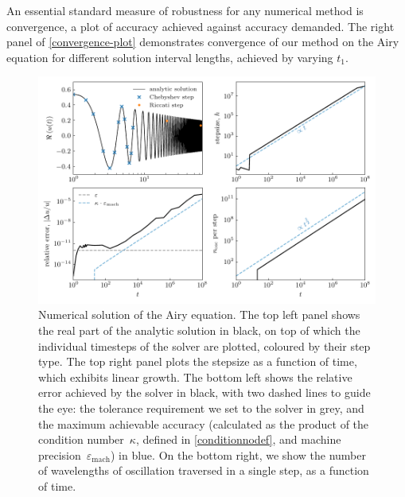 \documentclass[10pt]{article}
\newcommand{\om}{\omega}
\begin{document}
An essential standard measure of robustness for any numerical method is convergence, a plot of accuracy achieved against accuracy demanded. The right panel of \cref{convergence-plot} demonstrates convergence of our method on the Airy equation for different solution interval lengths, achieved by varying $t_1$.

\begin{figure}[tb]
    \centering
    \includegraphics{plots/airy-numsol.pdf}
    \caption{\label{airy-results} Numerical solution of the Airy equation. The
    top left panel shows the real part of the analytic solution in black, on
    top of which the individual timesteps of the solver are plotted, coloured
    by their step type. The top right panel plots the stepsize as a function of
    time, which exhibits linear growth. The bottom left shows the relative
    error achieved by the solver in black, with two dashed lines to guide the
    eye: the tolerance requirement we set to the solver in grey, and the
    maximum achievable accuracy (calculated as the product of the condition
    number~$\kappa$, defined in \cref{conditionnodef}, and machine precision~$\varepsilon_{\text{mach}}$) in blue. On the
    bottom right, we show the number of wavelengths of oscillation traversed in
    a single step, as a function of time. 
    }
\end{figure}
\end{document}
